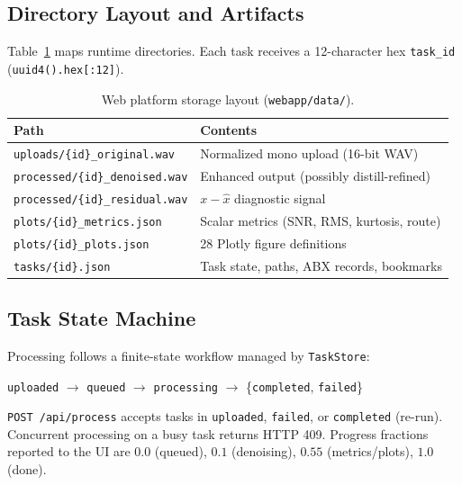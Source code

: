 \subsection{Directory Layout and Artifacts}

Table~\ref{tab:web_storage} maps runtime directories. Each task receives a 12-character hex \texttt{task\_id} (\texttt{uuid4().hex[:12]}).

\begin{table}[H]
  \centering
  \caption{Web platform storage layout (\texttt{webapp/data/}).}
  \label{tab:web_storage}
  \small
  \begin{tabular}{ll}
    \toprule
    \textbf{Path} & \textbf{Contents} \\
    \midrule
    \texttt{uploads/\{id\}\_original.wav} & Normalized mono upload (16-bit WAV) \\
    \texttt{processed/\{id\}\_denoised.wav} & Enhanced output (possibly distill-refined) \\
    \texttt{processed/\{id\}\_residual.wav} & $x - \hat{x}$ diagnostic signal \\
    \texttt{plots/\{id\}\_metrics.json} & Scalar metrics (SNR, RMS, kurtosis, route) \\
    \texttt{plots/\{id\}\_plots.json} & 28 Plotly figure definitions \\
    \texttt{tasks/\{id\}.json} & Task state, paths, ABX records, bookmarks \\
    \bottomrule
  \end{tabular}
\end{table}

\subsection{Task State Machine}

Processing follows a finite-state workflow managed by \texttt{TaskStore}:

\begin{center}
\small
\texttt{uploaded} $\rightarrow$ \texttt{queued} $\rightarrow$ \texttt{processing} $\rightarrow$ \{\texttt{completed}, \texttt{failed}\}
\end{center}

\texttt{POST /api/process} accepts tasks in \texttt{uploaded}, \texttt{failed}, or \texttt{completed} (re-run). Concurrent processing on a busy task returns HTTP 409. Progress fractions reported to the UI are $0.0$ (queued), $0.1$ (denoising), $0.55$ (metrics/plots), $1.0$ (done).

